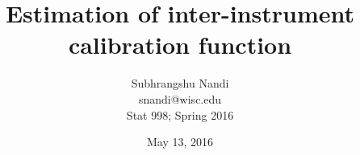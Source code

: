 \documentclass[12pt]{article}
\begin{document}
\title{Estimation of inter-instrument calibration function}

\author{Subhrangshu Nandi \\
	snandi@wisc.edu \\	
	Stat 998; Spring 2016}
\date{May 13, 2016}

\maketitle









%
\end{document}
